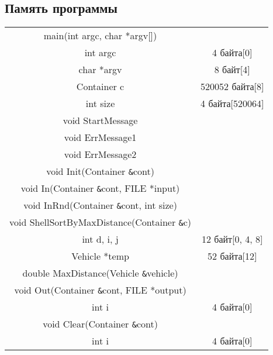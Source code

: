 \documentclass[a4paper]{article}
\begin{document}
\subsection*{Память программы}
\begin{tabular}{ |c|c| }
    \hline
    main(int argc, char *argv[]) &  \\
    int argc & 4 байта[0]\\
    char *argv & 8 байт[4]\\
    Container c &  520052 байта[8]\\
    int size & 4 байта[520064]\\
    \hline
    void StartMessage & \\
    \hline
    void ErrMessage1 & \\
    \hline
    void ErrMessage2 & \\
    \hline
    void Init(Container \verb|&|cont) & \\
    \hline
    void In(Container \verb|&|cont, FILE *input) & \\
    \hline
    void InRnd(Container \verb|&|cont, int size) & \\
    \hline
    void ShellSortByMaxDistance(Container \verb|&|c) & \\
    int d, i, j & 12 байт[0, 4, 8]\\
    Vehicle *temp & 52 байта[12]\\
    \hline
    double MaxDistance(Vehicle \verb|&|vehicle) & \\
    \hline
    void Out(Container \verb|&|cont, FILE *output) & \\
    int i & 4 байта[0]\\
    \hline
    void Clear(Container \verb|&|cont) & \\
    int i & 4 байта[0]\\
    \hline
\end{tabular}

\newpage
\end{document}
